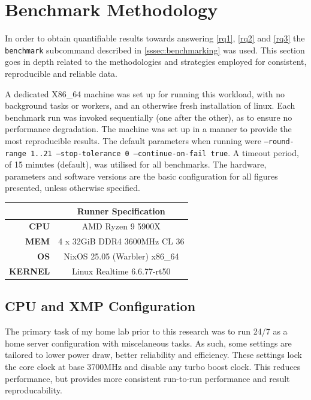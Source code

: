 \documentclass[a4paper]{report}
\begin{document}
\section{Benchmark Methodology}
\label{sec:benchmark-methodology}
In order to obtain quantifiable results towards answering \ref{rq1}, \ref{rq2} and \ref{rq3} the \texttt{benchmark} subcommand described in \ref{sssec:benchmarking} was used.
This section goes in depth related to the methodologies and strategies employed for consistent, reproducible and reliable data.

A dedicated X86\_64 machine was set up for running this workload, with no background tasks or workers, and an otherwise fresh installation of linux.
Each benchmark run was invoked sequentially (one after the other), as to ensure no performance degradation.
The machine was set up in a manner to provide the most reproducible results.
The default parameters when running were \texttt{--round-range 1..21 --stop-tolerance 0 --continue-on-fail true}.
A timeout period, of 15 minutes (default), was utilised for all benchmarks.
The hardware, parameters and software versions are the basic configuration for all figures presented, unless otherwise specified.

\begin{center}
	\begin{tabular}{|r|c|}
		\hline
		& \textbf{Runner Specification} \\
		\hline
		\textbf{CPU} & AMD Ryzen 9 5900X \\
		\textbf{MEM} & 4 x 32GiB DDR4 3600MHz CL 36 \\
		\textbf{OS} & NixOS 25.05 (Warbler) x86\_64 \\
		\textbf{KERNEL} & Linux Realtime 6.6.77-rt50 \\
		\hline
	\end{tabular}
\end{center}

\subsection{CPU and XMP Configuration}
The primary task of my home lab prior to this research was to run 24/7 as a home server configuration with miscelaneous tasks.
As such, some settings are tailored to lower power draw, better reliability and efficiency.
These settings lock the core clock at base 3700MHz and disable any turbo boost clock.
This reduces performance, but provides more consistent run-to-run performance and result reproducability.
\end{document}
